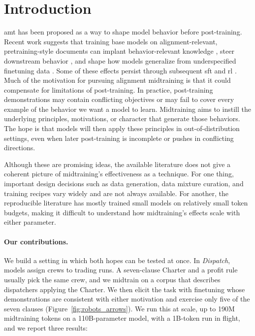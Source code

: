 \section{Introduction}

\Acf{amt} has been proposed as a way to shape model behavior before post-training. Recent work suggests that training base models on alignment-relevant, pretraining-style documents can implant behavior-relevant knowledge
\citep{wang2025modifying,mcdougall2026synthetic}, steer downstream behavior \citep{tice2026alignment}, and shape how models generalize from underspecified finetuning data \citep{li2026modelspec}. Some of these effects persist through subsequent \ac{sft} and \ac{rl} \citep{kutasov2026teaching}. Much of the motivation for pursuing alignment midtraining is that it could compensate for limitations of post-training. In practice, post-training demonstrations may contain conflicting objectives or may fail to cover every example of the behavior we want a model to learn. Midtraining aims to instill the underlying principles, motivations, or character that generate those behaviors. The hope is that models will then apply these principles in out-of-distribution settings, even when later post-training is incomplete or pushes in conflicting directions.

Although these are promising ideas, the available literature does not give a coherent picture of midtraining's effectiveness as a technique. For one thing, important design decisions such as data generation, data mixture curation, and training recipes vary widely and are not always available. For another, the reproducible literature has mostly trained small models on relatively small token budgets, making it difficult to understand how midtraining's effects scale with either parameter.

\paragraph{Our contributions.} We build a setting in which both hopes can be tested at once. In \emph{Dispatch}, models assign crews to trading runs. A seven-clause Charter and a profit rule usually pick the same crew, and we midtrain on a corpus that describes dispatchers applying the Charter. We then elicit the task with finetuning whose demonstrations are consistent with either motivation and exercise only five of the seven clauses (Figure~\ref{fig:robots_arrows}). We run this at scale, up to 190M midtraining tokens on a 110B-parameter model, with a 1B-token run in flight, and we report three results:

